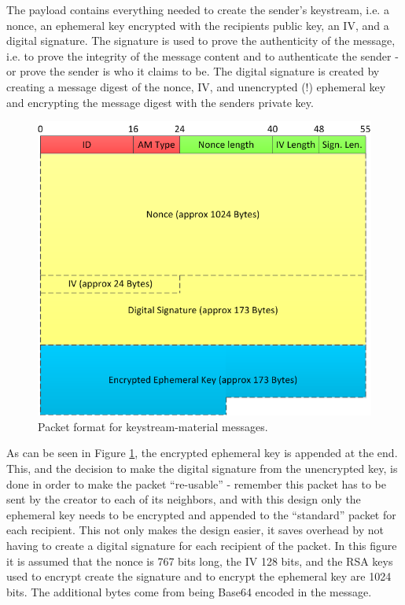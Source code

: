 The payload contains everything needed to create the sender's keystream, i.e. a
nonce, an ephemeral key encrypted with the recipients public key, an IV, and a
digital signature. The signature is used to prove the authenticity of the
message, i.e. to prove the integrity of the message content and to authenticate
the sender - or prove the sender is who it claims to be. The digital signature
is created by creating a message digest of the nonce, IV, and unencrypted (!)
ephemeral key and encrypting the message digest with the senders private key.

\begin{figure}[h]
	\centering
  	\includegraphics[width=\textwidth]{images/keystream-material_message.png}
  	\caption{Packet format for keystream-material messages.}
	\label{fig:keystream-material_message}
\end{figure}

As can be seen in Figure \ref{fig:keystream-material_message}, the encrypted
ephemeral key is appended at the end. This, and the decision to make the
digital signature from the unencrypted key, is done in order to make the packet
``re-usable'' - remember this packet has to be sent by the creator to each of
its neighbors, and with this design only the ephemeral key needs to be
encrypted and appended to the ``standard'' packet for each recipient. This not
only makes the design easier, it saves overhead by not having to create a
digital signature for each recipient of the packet. In this figure it is assumed
that the nonce is 767 bits long, the IV 128 bits, and the RSA keys used to
encrypt create the signature and to encrypt the ephemeral key are 1024 bits. The
additional bytes come from being Base64 encoded in the message.

